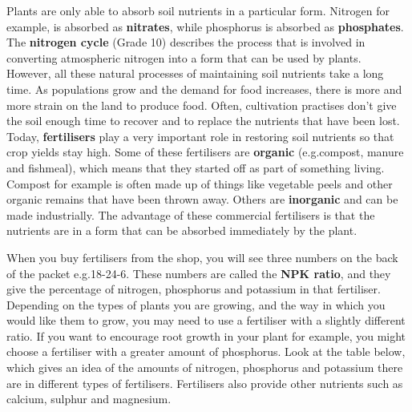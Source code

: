 Plants are only able to absorb soil nutrients in a particular form. Nitrogen for example, is absorbed as \textbf{nitrates}, while phosphorus is absorbed as \textbf{phosphates}. The \textbf{nitrogen cycle} (Grade 10) describes the process that is involved in converting atmospheric nitrogen into a form that can be used by plants. \\ 

However, all these natural processes of maintaining soil nutrients take a long time. As populations grow and the demand for food increases, there is more and more strain on the land to produce food. Often, cultivation practises don't give the soil enough time to recover and to replace the nutrients that have been lost. Today, \textbf{fertilisers} play a very important role in restoring soil nutrients so that crop yields stay high. Some of these fertilisers are \textbf{organic} (e.g.\@ compost, manure and fishmeal), which means that they started off as part of something living. Compost for example is often made up of things like vegetable peels and other organic remains that have been thrown away. Others are \textbf{inorganic} and can be made industrially. The advantage of these commercial fertilisers is that the nutrients are in a form that can be absorbed immediately by the plant.


When you buy fertilisers from the shop, you will see three numbers on the back of the packet e.g.\@ 18-24-6. These numbers are called the \textbf{NPK ratio}, and they give the percentage of nitrogen, phosphorus and potassium in that fertiliser. Depending on the types of plants you are growing, and the way in which you would like them to grow, you may need to use a fertiliser with a slightly different ratio. If you want to encourage root growth in your plant for example, you might choose a fertiliser with a greater amount of phosphorus. Look at the table below, which gives an idea of the amounts of nitrogen, phosphorus and potassium there are in different types of fertilisers. Fertilisers also provide other nutrients such as calcium, sulphur and magnesium. 

